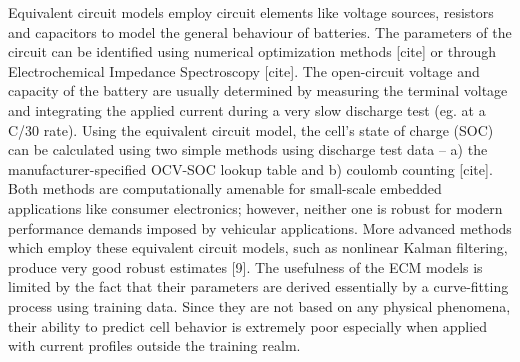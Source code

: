 Equivalent  circuit  models  employ   circuit  elements  like  voltage  sources,
resistors  and capacitors  to  model  the general  behaviour  of batteries.  The
parameters of the circuit can be identified using numerical optimization methods
{[}cite{]}  or through  Electrochemical Impedance  Spectroscopy {[}cite{]}.  The
open-circuit  voltage and  capacity of  the  battery are  usually determined  by
measuring the terminal voltage and integrating the applied current during a very
slow discharge  test (eg. at a  C/30 rate). Using the  equivalent circuit model,
the cell\textquoteright  s state  of charge  (SOC) can  be calculated  using two
simple  methods  using discharge  test  data  -- a)  the  manufacturer-specified
OCV-SOC  lookup table  and  b)  coulomb counting  {[}cite{]}.  Both methods  are
computationally  amenable for  small-scale embedded  applications like  consumer
electronics;  however, neither  one  is robust  for  modern performance  demands
imposed  by vehicular  applications. More  advanced methods  which employ  these
equivalent circuit models, such as nonlinear Kalman filtering, produce very good
robust estimates  {[}9{]}. The usefulness  of the ECM  models is limited  by the
fact that  their parameters are  derived essentially by a  curve-fitting process
using training data.  Since they are not based on  any physical phenomena, their
ability to predict cell behavior is  extremely poor especially when applied with
current profiles outside the training realm.


